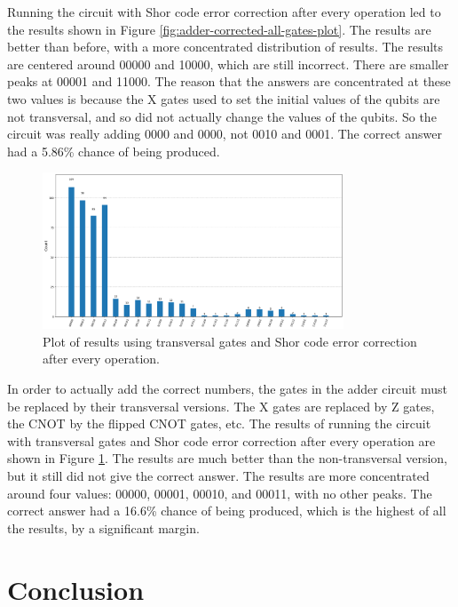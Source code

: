 \documentclass[letterpaper]{article}
\begin{document}
Running the circuit with Shor code error correction after every operation led to the results shown in Figure \ref{fig:adder-corrected-all-gates-plot}. The results are better than before, with a more concentrated distribution of results. The results are centered around 00000 and 10000, which are still incorrect. There are smaller peaks at 00001 and 11000. The reason that the answers are concentrated at these two values is because the X gates used to set the initial values of the qubits are not transversal, and so did not actually change the values of the qubits. So the circuit was really adding 0000 and 0000, not 0010 and 0001. The correct answer had a 5.86\% chance of being produced.

\begin{figure}[H]
    \centering
    \includegraphics[width=0.8\textwidth]{adder_transversal_plot}
    \caption{Plot of results using transversal gates and Shor code error correction after every operation.}
    \label{fig:adder-transversal-plot}
\end{figure}

In order to actually add the correct numbers, the gates in the adder circuit must be replaced by their transversal versions. The X gates are replaced by Z gates, the CNOT by the flipped CNOT gates, etc. The results of running the circuit with transversal gates and Shor code error correction after every operation are shown in Figure \ref{fig:adder-transversal-plot}. The results are much better than the non-transversal version, but it still did not give the correct answer. The results are more concentrated around four values: 00000, 00001, 00010, and 00011, with no other peaks. The correct answer had a 16.6\% chance of being produced, which is the highest of all the results, by a significant margin.

\section{Conclusion}
\end{document}
